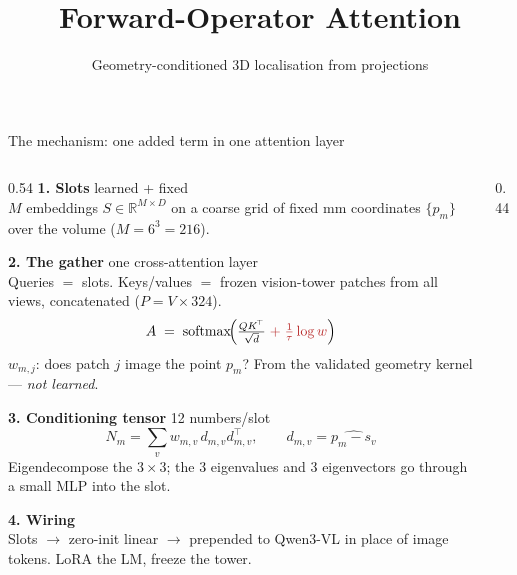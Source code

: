 \documentclass[aspectratio=169,10pt]{beamer}
\title{Forward-Operator Attention}
\subtitle{Geometry-conditioned 3D localisation from projections}
\date{}
\newcommand{\Geo}[1]{\textcolor{geo}{#1}}
\newcommand{\Learn}[1]{\textcolor{learn}{#1}}
\begin{document}
\begin{frame}{The mechanism: one added term in one attention layer}
\vspace{-1mm}
\begin{columns}[T,onlytextwidth]
\begin{column}{0.54\textwidth}
\footnotesize
\textbf{1. Slots} \hfill\Learn{learned} + \Geo{fixed}\\[0.5mm]
$M$ embeddings $S\in\mathbb{R}^{M\times D}$ on a coarse grid of
\Geo{fixed mm coordinates} $\{p_m\}$ over the volume
($M=6^3=216$).

\medskip
\textbf{2. The gather} \hfill one cross-attention layer\\[0.5mm]
Queries $=$ slots. Keys/values $=$ \textcolor{frozen}{frozen}
vision-tower patches from all views, concatenated ($P=V\!\times\!324$).
\[
A \;=\; \mathrm{softmax}\!\Big(\tfrac{QK^{\!\top}}{\sqrt{d}}
   \;\Geo{+\;\tfrac{1}{\tau}\log w}\Big)
\]
\Geo{$w_{m,j}$}: does patch $j$ image the point $p_m$? From the
validated geometry kernel --- \emph{not learned}.

\medskip
\textbf{3. Conditioning tensor} \hfill 12 numbers/slot\\[0.5mm]
\[
N_m=\sum_{v} w_{m,v}\, d_{m,v} d_{m,v}^{\!\top},
\qquad d_{m,v}=\widehat{p_m - s_v}
\]
Eigendecompose the $3\!\times\!3$; the 3 eigenvalues and 3
eigenvectors go through a small MLP into the slot.

\medskip
\textbf{4. Wiring}\\[0.5mm]
Slots $\to$ \Learn{zero-init} linear $\to$ prepended to Qwen3-VL in
place of image tokens. LoRA the LM, freeze the tower.
\end{column}

\begin{column}{0.44\textwidth}
\centering
\vspace{1mm}
\end{column}
\end{columns}
\end{frame}
\end{document}
